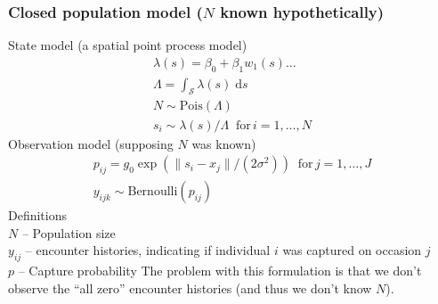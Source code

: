 \documentclass[color=usenames,dvipsnames]{beamer}\usepackage[]{graphicx}\usepackage[]{color}
\begin{document}
\begin{frame}
  \frametitle{\large Closed population model ($N$ known hypothetically) }
  \small
  State model (a spatial point process model) \\
  \begin{gather*}
    \lambda(s) = \beta_0 + \beta_1 w_1(s) \dots \\
    \Lambda = \int_{\mathcal{S}} \lambda(s) \; \mathrm{d}s \\
    N \sim \mathrm{Pois}(\Lambda) \\
    s_i \sim \lambda(s)/\Lambda \;\; \mathrm{for}\, i=1,\dots,N 
  \end{gather*}
  \pause
  \vfill
  Observation model (supposing $N$ was known)
  \begin{gather*}
    p_{ij} = g_0\exp(\|s_i - x_j\|/(2\sigma^2))  \;\; \mathrm{for}\, j=1,\dots,J  \\
    y_{ijk} \sim \mathrm{Bernoulli}(p_{ij})
  \end{gather*}
  \pause
  \small
  Definitions \\
  $N$ -- Population size \\
  \hangindent=0.8cm $y_{ij}$ -- encounter histories, indicating if
  individual $i$ was captured on occasion $j$ \\  
  $p$ -- Capture probability
  \pause
  \vfill
  The problem with this formulation is that we don't observe the ``all
  zero'' encounter histories (and thus we don't know $N$). 
\end{frame}
\end{document}

